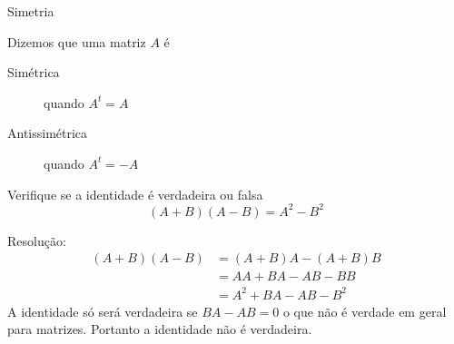 \begin{teoria}{Simetria}

    Dizemos que uma matriz $A$ é 
    \begin{description}
        \item[Simétrica]      \tabto{20mm} quando $A^t=A$
        \item[Antissimétrica] \tabto{20mm} quando $A^t=-A$
    \end{description}
    
\end{teoria}

\begin{exemplos}
    
    \begin{exemplo}
        Verifique se a identidade é verdadeira ou falsa
        \[ (A+B)(A-B) = A^2 - B^2 \]
        
        Resolução:    
        \begin{align*}
            (A+B)(A-B) & = (A+B)A-(A+B)B \\
                       & = AA + BA - AB - BB \\
                       & = A^2 + BA - AB - B^2
        \end{align*}
        A identidade só será verdadeira se $BA - AB=0$ o que não é verdade em geral para matrizes. 
        Portanto a identidade não é verdadeira.
        

\end{exemplo}
\end{exemplos}
